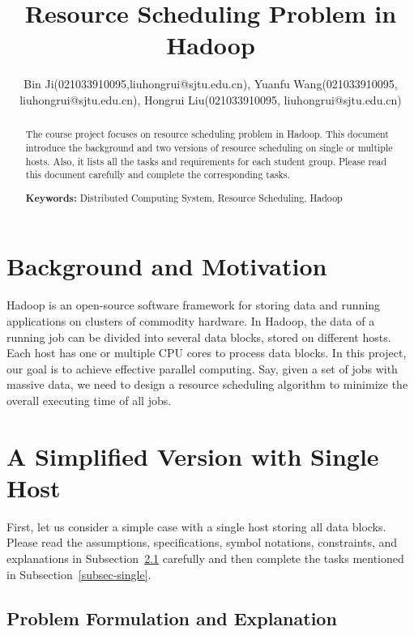 \documentclass{llncs}
\title{Resource Scheduling Problem in Hadoop}
\subtitle{\color{blue}{Project for Algorithm Design and Analysis} \vspace{-6mm}}
\author{Bin Ji(021033910095,liuhongrui@sjtu.edu.cn), Yuanfu Wang(021033910095,  liuhongrui@sjtu.edu.cn), Hongrui Liu(021033910095, liuhongrui@sjtu.edu.cn)}
\institute{Department of Computer Science and Engineering, \\ Shanghai Jiao Tong University, Shanghai, China}
\begin{document}



\maketitle
\begin{abstract}\vspace{-5mm}

The course project focuses on resource scheduling problem in Hadoop. This document introduce the background and two versions of resource scheduling on single or multiple hosts. Also, it lists all the tasks and requirements for each student group. Please read this document carefully and complete the corresponding tasks.

\textbf{Keywords:} Distributed Computing System, Resource Scheduling, Hadoop
\end{abstract}

\section{Background and Motivation}
\label{sec-Hadoop}

Hadoop is an open-source software framework for storing data and running applications on clusters of commodity hardware. In Hadoop, the data of a running job can be divided into several data blocks, stored on different hosts. Each host has one or multiple CPU cores to process data blocks. In this project, our goal is to achieve effective parallel computing. Say, given a set of jobs with massive data, we need to design a resource scheduling algorithm to minimize the overall executing time of all jobs.



\section{A Simplified Version with Single Host}
\label{sec-problem1}

First, let us consider a simple case with a single host storing all data blocks. Please read the assumptions, specifications, symbol notations, constraints, and explanations in Subsection~\ref{subsec-preliminary} carefully and then complete the tasks mentioned in Subsection~\ref{subsec-single}.

\subsection{Problem Formulation and Explanation} \label{subsec-preliminary}
\end{document}
